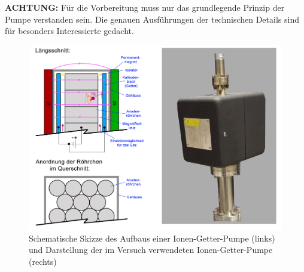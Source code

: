 \documentclass[
class=book,
accentcolor=1b,
custommargins=geometry,
fontsize=11pt,
thesis={type=Versuchsanleitung},
ruledheaders=all,
headline=false,
instbox=false,
marginpar=false,
title=small,
ignore-missing-data=true,
twoside=false,
logofile=apqdesign/tuda_logo.pdf,
pdfa=false %
]{apqpub}
\renewcommand{\emph}[1]{\textcolor{TUDa-1b}{\textbf{#1}}}
\begin{document}
			\emph{ACHTUNG:} Für die Vorbereitung muss nur das grundlegende Prinzip der Pumpe verstanden sein. Die genauen Ausführungen der technischen Details sind für besonders Interessierte gedacht.
			
			\begin{figure}[htb!]
				\centering
				\includegraphics[width=\textwidth]{graphics/IGP.jpg}
				\caption{Schematische Skizze des Aufbaus einer Ionen-Getter-Pumpe (links) und Darstellung der im Versuch verwendeten Ionen-Getter-Pumpe (rechts)}
				\label{fig:IGP}
			\end{figure}
\end{document}
